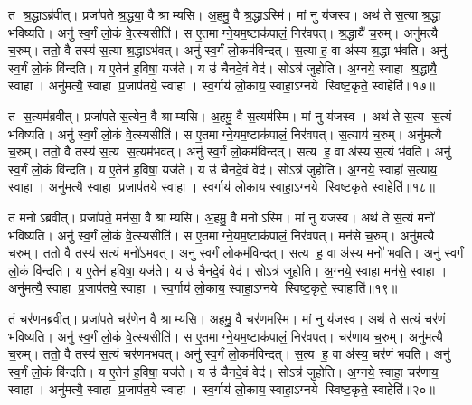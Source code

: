    त श्र॒द्धाऽब्र॑वीत्।
   प्रजा॑पते श्र॒द्धया॒ वै श्राम्यसि।
   अ॒हमु॒ वै श्र॒द्धाऽस्मि॑।
   मां नु य॑जस्व।
   अथ॑ ते स॒त्या श्र॒द्धा भ॑विष्यति।
   अनु॑ स्व॒र्गं लो॒कं वे॒त्स्यसीति॑।
   स ए॒तमाग्ने॒यम॒ष्टाक॑पालं॒ निर॑वपत्।
   श्र॒द्धायै॑ च॒रुम्।
   अनु॑मत्यै च॒रुम्।
   ततो॒ वै तस्य॑ स॒त्या श्र॒द्धाऽभ॑वत्।
   अनु॑ स्व॒र्गं लो॒कम॑विन्दत्।
   स॒त्या ह॒ वा अ॑स्य श्र॒द्धा भ॑वति।
   अनु॑ स्व॒र्गं लो॒कं वि॑न्दति।
   य ए॒तेन॑ ह॒विषा॒ यज॑ते।
   य उ॑ चैनदे॒वं वेद॑।
   सोऽत्र॑ जुहोति।
   अ॒ग्नये॒ स्वाहा श्र॒द्धायै॒ स्वाहा।
   अनु॑मत्यै॒ स्वाहा प्र॒जाप॑तये॒ स्वाहा।
   स्व॒र्गाय॑ लो॒काय॒ स्वाहा॒ऽग्नये स्विष्ट॒कृते॒ स्वाहेति॑॥१७॥

   त स॒त्यम॑ब्रवीत्।
   प्रजा॑पते स॒त्येन॒ वै श्राम्यसि।
   अ॒हमु॒ वै स॒त्यम॑स्मि।
   मां नु य॑जस्व ।
   अथ॑ ते स॒त्य स॒त्यं भ॑विष्यति।
   अनु॑ स्व॒र्गं लो॒कं वे॒त्स्यसीति॑।
   स ए॒तमाग्ने॒यम॒ष्टाक॑पालं॒ निर॑वपत्।
   स॒त्याय॑ च॒रुम्।
   अनु॑मत्यै च॒रुम्।
   ततो॒ वै तस्य॑ स॒त्य स॒त्यम॑भवत्।
   अनु॑ स्व॒र्गं लो॒कम॑विन्दत्।
   सत्य ह॒ वा अ॑स्य स॒त्यं भ॑वति।
   अनु॑ स्व॒र्गं लो॒कं वि॑न्दति।
   य ए॒तेन॑ ह॒विषा॒ यज॑ते।
   य उ॑ चैनदे॒वं वेद॑।
   सोऽत्र॑ जुहोति।
   अ॒ग्नये॒ स्वाहा॑ स॒त्याय॒ स्वाहा।
   अनु॑मत्यै॒ स्वाहा प्र॒जाप॑तये॒ स्वाहा।
   स्व॒र्गाय॑ लो॒काय॒ स्वाहा॒ऽग्नये स्विष्ट॒कृते॒ स्वाहेति॑॥१८॥

   तं मनोऽब्रवीत्।
   प्रजा॑पते॒ मन॑सा॒ वै श्राम्यसि।
   अ॒हमु॒ वै मनोऽस्मि।
   मां नु य॑जस्व।
   अथ॑ ते स॒त्यं मनो॑ भविष्यति।
   अनु॑ स्व॒र्गं लो॒कं वे॒त्स्यसीति॑।
   स ए॒तमाग्ने॒यम॒ष्टाक॑पालं॒ निर॑वपत्।
   मन॑से च॒रुम्।
   अनु॑मत्यै च॒रुम्।
   ततो॒ वै तस्य॑ स॒त्यं मनो॑ऽभवत्।
   अनु॑ स्व॒र्गं लो॒कम॑विन्दत्।
   स॒त्य ह॒ वा अ॑स्य॒ मनो॑ भवति।
   अनु॑ स्व॒र्गं लो॒कं वि॑न्दति।
   य ए॒तेन॑ ह॒विषा॒ यज॑ते।
   य उ॑ चैनदे॒वं वेद॑।
   सोऽत्र॑ जुहोति।
   अ॒ग्नये॒ स्वाहा॒ मन॑से॒ स्वाहा।
   अनु॑मत्यै॒ स्वाहा प्र॒जाप॑तये॒ स्वाहा।
   स्व॒र्गाय॑ लो॒काय॒ स्वाहा॒ऽग्नये स्विष्ट॒कृते॒ स्वाहाति॑॥१९॥

   तं चर॑णमब्रवीत्।
   प्रजा॑पते॒ चर॑णेन॒ वै श्राम्यसि।
   अ॒हमु॒ वै चर॑णमस्मि।
   मां नु य॑जस्व।
   अथ॑ ते स॒त्यं चर॑णं भविष्यति।
   अनु॑ स्व॒र्गं लो॒कं वे॒त्स्यसीति॑।
   स ए॒तमाग्ने॒यम॒ष्टाक॑पालं॒ निर॑वपत्।
   चर॑णाय च॒रुम्।
   अनु॑मत्यै च॒रुम्।
   ततो॒ वै तस्य॑ स॒त्यं चर॑णमभवत्।
   अनु॑ स्व॒र्गं लो॒कम॑विन्दत्।
   स॒त्य ह॒ वा अ॑स्य॒ चर॑णं भवति।
   अनु॑ स्व॒र्गं लो॒कं वि॑न्दति।
   य ए॒तेन॑ ह॒विषा॒ यज॑ते।
   य उ॑ चैनदे॒वं वेद॑।
   सोऽत्र॑ जुहोति।
   अ॒ग्नये॒ स्वाहा॒ चर॑णाय॒ स्वाहा।
   अनु॑मत्यै॒ स्वाहा प्र॒जाप॑त॒ये स्वाहा।
   स्व॒र्गाय॑ लो॒काय॒ स्वाहा॒ऽग्नये स्विष्ट॒कृते॒ स्वाहेति॑॥२०॥

